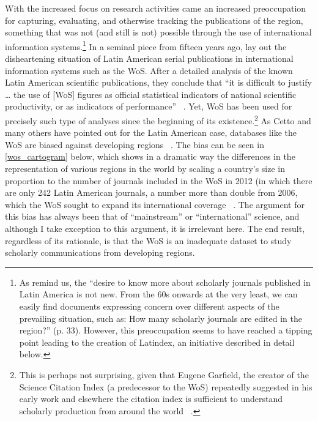 With the increased focus on research activities came an increased preoccupation for capturing, evaluating, and otherwise tracking the publications of the region, something that was not (and still is not) possible through the use of international information systems.\footnote{As  \citet{Alonso-Gamboa2012} remind us, the ``desire to know more about scholarly journals published in Latin America is not new. From the 60s onwards at the very least, we can easily find documents expressing concern over different aspects of the prevailing situation, such as: How many scholarly journals are edited in the region?'' (p. 33). However, this preoccupation seems to have reached a tipping point leading to the creation of Latindex, an initiative described in detail below.} In a seminal piece from fifteen years ago,  \citet{Cetto1998} lay out the disheartening situation of Latin American serial publications in international information systems such as the WoS. After a detailed analysis of the known Latin American scientific publications, they conclude that ``it is difficult to justify {\ldots} the use of [WoS] figures as official statistical indicators of national scientific productivity, or as indicators of performance'' ~\citep[p. 92]{Cetto1998}. Yet, WoS has been used for precisely such type of analyses since the beginning of its existence.\footnote{This is perhaps not surprising, given that Eugene Garfield, the creator of the Science Citation Index (a predecessor to the WoS) repeatedly suggested in his early work and elsewhere the citation index is sufficient to understand scholarly production from around the world ~\citep{Garfield1963,Garfield1983,Garfield1983a,Garfield1996a}.} As Cetto and many others have pointed out for the Latin American case, databases like the WoS are biased against developing regions ~\citep{Cetto1998,Collazo-Reyes2008}. The bias can be seen in \autoref{wos_cartogram} below, which shows in a dramatic way the differences in the representation of various regions in the world by scaling a country's size in proportion to the number of journals included in the WoS in 2012 (in which there are only 242 Latin American journals, a number more than double from 2006, which the WoS sought to expand its international coverage ~\citep{Testa2011}. The argument for this bias has always been that of ``mainstream'' or ``international'' science, and although I take exception to this argument, it is irrelevant here. The end result, regardless of its rationale, is that the WoS is an inadequate dataset to study scholarly communications from developing regions.

